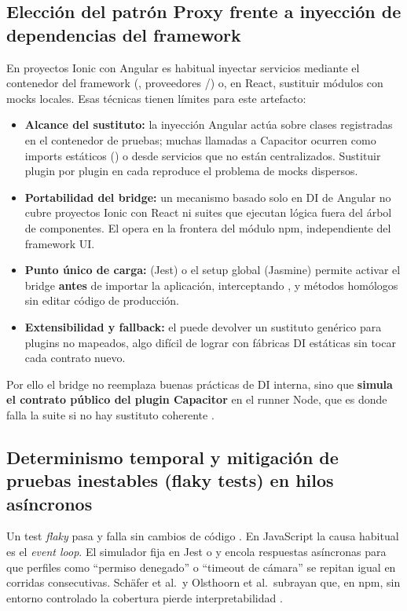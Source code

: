 \subsection{Elección del patrón Proxy frente a inyección de dependencias del framework}
\label{sec:proxy_vs_di}
En proyectos Ionic con Angular es habitual inyectar servicios mediante el contenedor del framework (, proveedores /) o, en React, sustituir módulos con mocks locales. Esas técnicas tienen límites para este artefacto:
\begin{itemize}
    \item \textbf{Alcance del sustituto:} la inyección Angular actúa sobre clases registradas en el contenedor de pruebas; muchas llamadas a Capacitor ocurren como imports estáticos () o desde servicios que no están centralizados. Sustituir plugin por plugin en cada  reproduce el problema de mocks dispersos.
    \item \textbf{Portabilidad del bridge:} un mecanismo basado solo en DI de Angular no cubre proyectos Ionic con React ni suites que ejecutan lógica fuera del árbol de componentes. El  opera en la frontera del módulo npm, independiente del framework UI.
    \item \textbf{Punto único de carga:}  (Jest) o el setup global (Jasmine) permite activar el bridge \textbf{antes} de importar la aplicación, interceptando ,  y métodos homólogos sin editar código de producción.
    \item \textbf{Extensibilidad y fallback:} el  puede devolver un sustituto genérico para plugins no mapeados, algo difícil de lograr con fábricas DI estáticas sin tocar cada contrato nuevo.
\end{itemize}
Por ello el bridge no reemplaza buenas prácticas de DI interna, sino que \textbf{simula el contrato público del plugin Capacitor} en el runner Node, que es donde falla la suite si no hay sustituto coherente \cite{capacitor2024testing,feathers2004working}.

\subsection{Determinismo temporal y mitigación de pruebas inestables (flaky tests) en hilos asíncronos}
\label{sec:determinismo_flaky}
Un test \textit{flaky} pasa y falla sin cambios de código \cite{luo2014flaky}. En JavaScript la causa habitual es el \textit{event loop}. El simulador fija  en Jest o  y encola respuestas asíncronas para que perfiles como ``permiso denegado'' o ``timeout de cámara'' se repitan igual en corridas consecutivas. Schäfer et al.\ y Olsthoorn et al.\ subrayan que, en npm, sin entorno controlado la cobertura pierde interpretabilidad \cite{schafer2024testpilot,olsthoorn2024syntest_javascript}.

